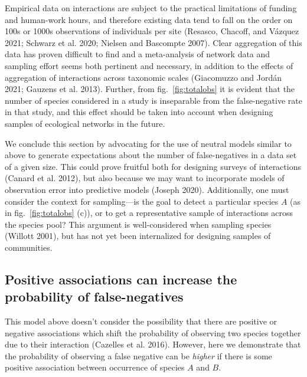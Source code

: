 \documentclass[11pt]{article}
\begin{document}
Empirical data on interactions are subject to the practical limitations
of funding and human-work hours, and therefore existing data tend to
fall on the order on 100s or 1000s observations of individuals per site
(Resasco, Chacoff, and Vázquez 2021; Schwarz et al. 2020; Nielsen and
Bascompte 2007). Clear aggregation of this data has proven difficult to
find and a meta-analysis of network data and sampling effort seems both
pertinent and necessary, in addition to the effects of aggregation of
interactions across taxonomic scales (Giacomuzzo and Jordán 2021;
Gauzens et al. 2013). Further, from fig.~\ref{fig:totalobs} it is
evident that the number of species considered in a study is inseparable
from the false-negative rate in that study, and this effect should be
taken into account when designing samples of ecological networks in the
future.

We conclude this section by advocating for the use of neutral models
similar to above to generate expectations about the number of
false-negatives in a data set of a given size. This could prove fruitful
both for designing surveys of interactions (Canard et al. 2012), but
also because we may want to incorporate models of observation error into
predictive models (Joseph 2020). Additionally, one must consider the
context for sampling---is the goal to detect a particular species \(A\)
(as in fig.~\ref{fig:totalobs} (c)), or to get a representative sample
of interactions across the species pool? This argument is
well-considered when sampling species (Willott 2001), but has not yet
been internalized for designing samples of communities.

\hypertarget{positive-associations-can-increase-the-probability-of-false-negatives}{%
\subsection{Positive associations can increase the probability of
false-negatives}\label{positive-associations-can-increase-the-probability-of-false-negatives}}

This model above doesn't consider the possibility that there are
positive or negative associations which shift the probability of
observing two species together due to their interaction (Cazelles et al.
2016). However, here we demonstrate that the probability of observing a
false negative can be \emph{higher} if there is some positive
association between occurrence of species \(A\) and \(B\).
\end{document}
